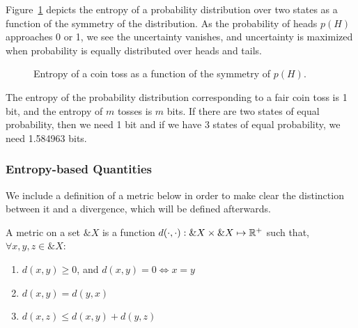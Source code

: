Figure~\ref{fig:entropy-coin-toss} depicts the entropy of a
probability distribution over two states as a function of the symmetry
of the distribution.  As the probability of heads $p(H)$ approaches 0
or 1, we see the uncertainty vanishes, and uncertainty is maximized
when probability is equally distributed over heads and tails.

\begin{figure}[H]
  \centering
  \caption{Entropy of a coin toss as a function of the symmetry of $p(H)$.}%
  \label{fig:entropy-coin-toss}
\end{figure}

\begin{example}
  The entropy of the probability distribution corresponding to a fair coin toss
  is 1 bit, and the entropy of $m$ tosses is $m$ bits. If there are two states
  of equal probability, then we need 1 bit and if we have 3 states of equal
  probability, we need 1.584963 bits.
\end{example}

\subsubsection*{Entropy-based Quantities}

We include a definition of a metric below in order to make clear the distinction
between it and a divergence, which will be defined afterwards.

\begin{definition}
  A \textnormal{\sffamily metric} on a set $\&X$ is a function $d(\cdot, \cdot): \&X \times
  \&X \mapsto \mathbb{R}^+$ such that, $\forall x, y, z \in \&X$:
  \begin{enumerate}
  \item $d(x, y) \geq 0$, and $d(x, y) = 0 \iff x = y$
  \item $d(x, y) = d(y, x)$
  \item $d(x, z) \leq d(x, y) + d(y, z)$
  \end{enumerate}
\end{definition}

